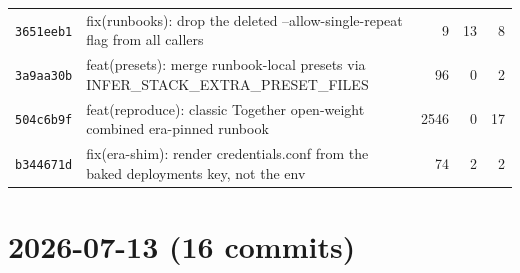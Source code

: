 \begin{longtable}{@{}p{}p{}r r r@{}}
\texttt{3651eeb1} & fix(runbooks): drop the deleted --allow-single-repeat flag from all callers & 9 & 13 & 8 \\
\texttt{3a9aa30b} & feat(presets): merge runbook-local presets via INFER\_STACK\_EXTRA\_PRESET\_FILES & 96 & 0 & 2 \\
\texttt{504c6b9f} & feat(reproduce): classic Together open-weight combined era-pinned runbook & 2546 & 0 & 17 \\
\texttt{b344671d} & fix(era-shim): render credentials.conf from the baked deployments key, not the env & 74 & 2 & 2 \\
\bottomrule\end{longtable}
\section*{2026-07-13 (16 commits)}
